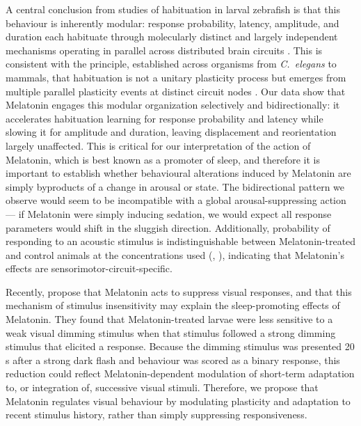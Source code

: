 \documentclass[9.5pt]{RandlettLab_elife}            %
\begin{document}
A central conclusion from studies of habituation in larval zebrafish is that this behaviour is inherently modular: response probability, latency, amplitude, and duration each habituate through molecularly distinct and largely independent mechanisms operating in parallel across distributed brain circuits \citep{Randlett2019-fj, Nelson2022, Lamire2023-he}.
This is consistent with the principle, established across organisms from \emph{C.\ elegans} to mammals, that habituation is not a unitary plasticity process but emerges from multiple parallel plasticity events at distinct circuit nodes \citep{ramaswami2014network, Cooke2020, McDiarmid2019-td}.
Our data show that Melatonin engages this modular organization selectively and bidirectionally: it accelerates habituation learning for response probability and latency while slowing it for amplitude and duration, leaving displacement and reorientation largely unaffected.
This is critical for our interpretation of the action of Melatonin, which is best known as a promoter of sleep, and therefore it is important to establish whether behavioural alterations induced by Melatonin are simply byproducts of a change in arousal or state. 
The bidirectional pattern we observe would seem to be incompatible with a global arousal-suppressing action — if Melatonin were simply inducing sedation, we would expect all response parameters would shift in the sluggish direction.
Additionally, probability of responding to an acoustic stimulus is indistinguishable between Melatonin-treated and control animals at the concentrations used (, \citealp{Lamire2023-he}), indicating that Melatonin's effects are sensorimotor-circuit-specific. 

Recently, \citet{Hill2026} propose that Melatonin acts to suppress visual responses, and that this mechanism of stimulus insensitivity may explain the sleep-promoting effects of Melatonin. 
They found that Melatonin-treated larvae were less sensitive to a weak visual dimming stimulus when that stimulus followed a strong dimming stimulus that elicited a response.
Because the dimming stimulus was presented 20 s after a strong dark flash and behaviour was scored as a binary response, this reduction could reflect Melatonin-dependent modulation of short-term adaptation to, or integration of, successive visual stimuli.
Therefore, we propose that Melatonin regulates visual behaviour by modulating plasticity and adaptation to recent stimulus history, rather than simply suppressing responsiveness.
\end{document}
